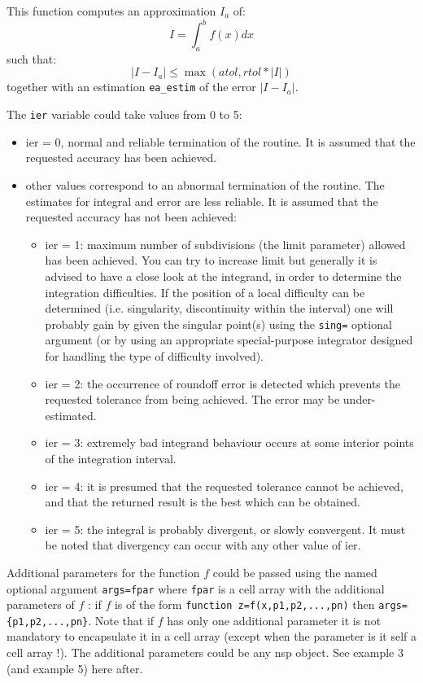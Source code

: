 \begin{mandescription}
This function computes an approximation $I_a$ of:
$$
   I = \int_a^b f(x) dx
$$
such that:
$$
   | I - I_a | \le  \max (atol, rtol*|I|)
$$
together with an estimation \verb+ea_estim+ of the error  $| I - I_a |$.

The \verb+ier+ variable could take values from 0 to 5: 
\begin{itemize}
\item ier = 0,  normal and reliable termination of the routine. It is assumed that the
      requested  accuracy has been achieved.
\item other values correspond to an abnormal termination of the routine. The estimates
      for integral and error are less reliable. It is assumed that the  requested accuracy
      has not been achieved:
      \begin{itemize}
      \item ier = 1: maximum number of subdivisions (the limit
            parameter) allowed has been achieved. You can try to
            increase limit but generally it is advised to have a close look at the
            integrand, in order to determine the integration
            difficulties. If the position of a local difficulty can
            be determined (i.e.  singularity, discontinuity within
            the interval) one will probably gain by given the singular
            point(s) using the \verb+sing=+ optional argument (or
            by using an appropriate special-purpose integrator 
            designed for handling the type  of difficulty involved).
      \item ier = 2: the occurrence of roundoff error is detected
            which prevents the requested tolerance from being
            achieved. The error may be under-estimated.
      \item ier = 3: extremely bad integrand behaviour occurs at 
            some interior points of the integration interval.
      \item ier = 4: it is presumed that the requested tolerance 
            cannot be achieved, and that the returned result is the
            best which can be obtained.
      \item ier = 5: the integral is probably divergent, or slowly
            convergent. It must be noted that divergency can occur with
            any other value of ier.
      \end{itemize}
\end{itemize}

Additional parameters for the function $f$ could be passed using the
named optional argument \verb+args=fpar+ where \verb+fpar+ is a 
cell array with the additional parameters of $f$ : if $f$ is of the form 
\verb+function z=f(x,p1,p2,...,pn)+ then \verb+args={p1,p2,...,pn}+. 
Note that if $f$ has only one additional parameter it is not mandatory 
to encapsulate it in a cell array (except when the parameter is it 
self a cell array !). The additional parameters could be any nsp object. 
See example 3 (and example 5) here after. 

\end{mandescription}

